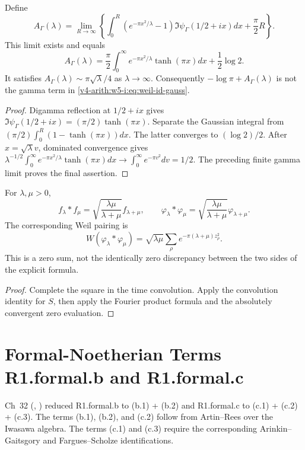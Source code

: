 \begin{proposition}
Define
\[
 A_\Gamma(\lambda)=\lim_{R\to\infty}
 \left\{\int_0^R(e^{-\pi x^2/\lambda}-1)
              \Im\psi_\Gamma(1/2+ix)dx+\frac\pi2 R\right\}.
\]
This limit exists and equals
\[
 A_\Gamma(\lambda)=\frac\pi2\int_0^\infty
                  e^{-\pi x^2/\lambda}\tanh(\pi x)dx
                  +\frac12\log2.
\]
It satisfies $A_\Gamma(\lambda)\sim\pi\sqrt\lambda/4$ as
$\lambda\to\infty$. Consequently $-\log\pi+A_\Gamma(\lambda)$
is not the gamma term in \eqref{v4-arith:w5-i:eq:weil-id-gauss}.
\end{proposition}
\begin{proof}
Digamma reflection at $1/2+ix$ gives
$\Im\psi_\Gamma(1/2+ix)=(\pi/2)\tanh(\pi x)$.
Separate the Gaussian integral from
$(\pi/2)\int_0^R(1-\tanh(\pi x))dx$.
The latter converges to $(\log2)/2$.
After $x=\sqrt\lambda v$, dominated convergence gives
$\lambda^{-1/2}\int_0^\infty e^{-\pi x^2/\lambda}
\tanh(\pi x)dx\to\int_0^\infty e^{-\pi v^2}dv=1/2$.
The preceding finite gamma limit proves the final assertion.
\end{proof}

\begin{proposition}
For $\lambda,\mu>0$,
\[
 f_\lambda*f_\mu=\sqrt{\frac{\lambda\mu}{\lambda+\mu}}
 f_{\lambda+\mu},\qquad
 \varphi_\lambda*\varphi_\mu
 =\sqrt{\frac{\lambda\mu}{\lambda+\mu}}\varphi_{\lambda+\mu}.
\]
The corresponding Weil pairing is
\[
 W(\varphi_\lambda*\varphi_\mu)
 =\sqrt{\lambda\mu}\sum_\rho e^{-\pi(\lambda+\mu)z_\rho^2}.
\]
This is a zero sum, not the identically zero discrepancy between the
two sides of the explicit formula.
\end{proposition}
\begin{proof}
Complete the square in the time convolution. Apply the convolution
identity for $S$, then apply the Fourier product formula and the
absolutely convergent zero evaluation.
\end{proof}

\section{Formal-Noetherian Terms R1.formal.b and R1.formal.c}
\label{v4-arith:w5-i:formal-noetherian}

Ch~32 (,
) reduced
R1.formal.b to (b.1) + (b.2) and R1.formal.c to (c.1) + (c.2) +
(c.3). The terms (b.1), (b.2), and (c.2) follow from Artin--Rees over
the Iwasawa algebra. The terms (c.1) and (c.3) require the corresponding
Arinkin--Gaitsgory and Fargues--Scholze identifications.

